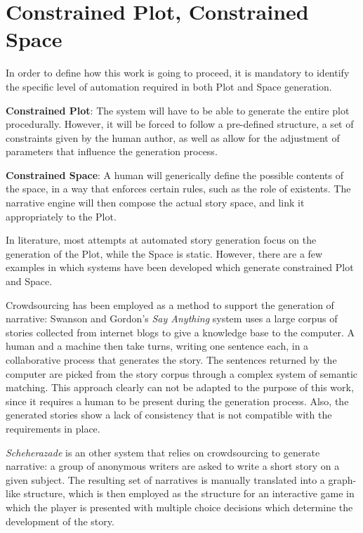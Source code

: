 \documentclass[12pt,a4paper,oneside]{report}
\begin{document}
\section{Constrained Plot, Constrained Space}
In order to define how this work is going to proceed, it is mandatory to identify the specific level of automation required in both Plot and Space generation.

\bigskip

\textbf{Constrained Plot}: The system will have to be able to generate the entire plot procedurally. However, it will be forced to follow a pre-defined structure, a set of constraints given by the human author, as well as allow for the adjustment of parameters that influence the generation process.

\textbf{Constrained Space}: A human will generically define the possible contents of the space, in a way that enforces certain rules, such as the role of existents. The narrative engine will then compose the actual story space, and link it appropriately to the Plot.

\bigskip

In literature, most attempts at automated story generation focus on the generation of the Plot, while the Space is static. However, there are a few examples in which systems have been developed which generate constrained Plot and Space.

\bigskip

Crowdsourcing has been employed as a method to support the generation of narrative: Swanson and Gordon's \textit{Say Anything} \cite{swanson08} system uses a large corpus of stories collected from internet blogs to give a knowledge base to the computer. A human and a machine then take turns, writing one sentence each, in a collaborative process that generates the story. The sentences returned by the computer are picked from the story corpus through a complex system of semantic matching. This approach clearly can not be adapted to the purpose of this work, since it requires a human to be present during the generation process. Also, the generated stories show a lack of consistency that is not compatible with the requirements in place.

\textit{Scheherazade} \cite{scheherazade} is an other system that relies on crowdsourcing to generate narrative: a group of anonymous writers are asked to write a short story on a given subject. The resulting set of narratives is manually translated into a graph-like structure, which is then employed as the structure for an interactive game in which the player is presented with multiple choice decisions which determine the development of the story.
\end{document}
